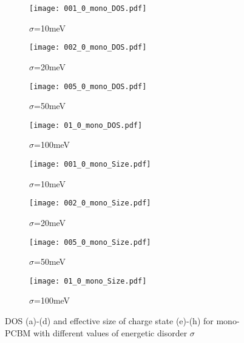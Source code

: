 \documentclass[a4paper,12pt]{article}
\begin{document}
\begin{figure}[H]
\centering
\begin{subfigure}[b]{0.24\textwidth}
\texttt{[image: 001\_0\_mono\_DOS.pdf]}
\caption{$\sigma$=10meV}
\end{subfigure}
\begin{subfigure}[b]{0.24\textwidth}
\texttt{[image: 002\_0\_mono\_DOS.pdf]}
\caption{$\sigma$=20meV}
\end{subfigure}
\begin{subfigure}[b]{0.24\textwidth}
\texttt{[image: 005\_0\_mono\_DOS.pdf]}
\caption{$\sigma$=50meV}
\end{subfigure}
\begin{subfigure}[b]{0.24\textwidth}
\texttt{[image: 01\_0\_mono\_DOS.pdf]}
\caption{$\sigma$=100meV}
\end{subfigure}
\begin{subfigure}[b]{0.24\textwidth}
\texttt{[image: 001\_0\_mono\_Size.pdf]}
\caption{$\sigma$=10meV}
\end{subfigure}
\begin{subfigure}[b]{0.24\textwidth}
\texttt{[image: 002\_0\_mono\_Size.pdf]}
\caption{$\sigma$=20meV}
\end{subfigure}
\begin{subfigure}[b]{0.24\textwidth}
\texttt{[image: 005\_0\_mono\_Size.pdf]}
\caption{$\sigma$=50meV}
\end{subfigure}
\begin{subfigure}[b]{0.24\textwidth}
\texttt{[image: 01\_0\_mono\_Size.pdf]}
\caption{$\sigma$=100meV}
\end{subfigure}
\caption{DOS (a)-(d) and effective size of charge state (e)-(h) for mono-PCBM with different values of energetic disorder $\sigma$}
\label{fig:dism}
\end{figure}
\end{document}
